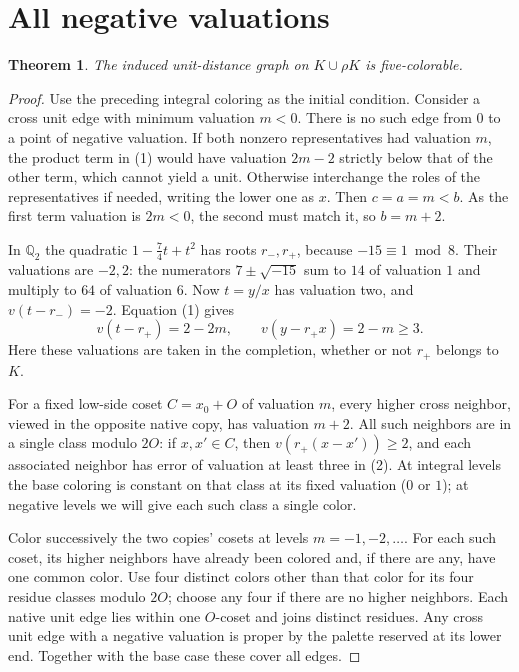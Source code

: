 \documentclass[10pt,letterpaper]{article}
\newtheorem{theorem}{Theorem}
\begin{document}
\section*{All negative valuations}
\begin{theorem}
The induced unit-distance graph on \(K\cup\rho K\) is five-colorable.
\end{theorem}
\begin{proof}
Use the preceding integral coloring as the initial condition.
Consider a cross unit edge with minimum valuation \(m<0\).
There is no such edge from \(0\) to a point of negative valuation.
If both nonzero representatives had valuation \(m\), the product
term in (1) would have valuation \(2m-2\) strictly below that
of the other term, which cannot yield a unit. Otherwise interchange
the roles of the representatives if needed, writing the lower
one as \(x\). Then \(c=a=m<b\). As the first term valuation
is \(2m<0\), the second must match it, so \(b=m+2\).

In \(\mathbb Q_2\) the quadratic \(1-\tfrac74t+t^2\)
has roots \(r_-,r_+\), because \(-15\equiv1\bmod 8\).
Their valuations are \(-2,2\): the numerators \(7\pm\sqrt{-15}\)
sum to \(14\) of valuation \(1\) and multiply to \(64\) of
valuation \(6\). Now \(t=y/x\) has valuation two, and
\(v(t-r_-)=-2\). Equation (1) gives
\[
  v(t-r_+)=2-2m,\qquad v(y-r_+x)=2-m\ge3.
 \tag{2}
\]
Here these valuations are taken in the completion,
whether or not \(r_+\) belongs to \(K\).

For a fixed low-side coset \(C=x_0+O\) of valuation \(m\),
every higher cross neighbor, viewed in the opposite native copy,
has valuation \(m+2\). All such neighbors are in a single class
modulo \(2O\): if \(x,x'\in C\), then
\(v(r_+(x-x'))\ge2\), and each associated neighbor has error
of valuation at least three in (2). At integral levels the
base coloring is constant on that class at its fixed valuation
(\(0\) or \(1\)); at negative levels we will give each such
class a single color.

Color successively the two copies' cosets at levels \(m=-1,-2,\ldots\).
For each such coset, its higher neighbors have already been colored
and, if there are any, have one common color. Use four distinct
colors other than that color for its four residue classes modulo
\(2O\); choose any four if there are no higher neighbors.
Each native unit edge lies within one \(O\)-coset and joins distinct
residues. Any cross unit edge with a negative valuation is proper
by the palette reserved at its lower end. Together with the base
case these cover all edges.
\end{proof}
\end{document}
